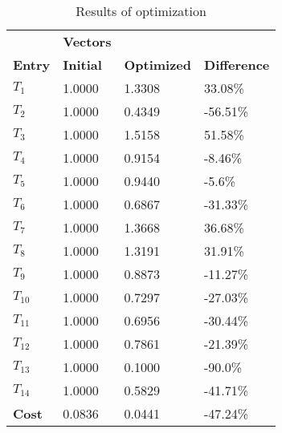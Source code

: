 \begin{table}[H]
\centering
\begin{tabular}{llll}
\textbf{}      & \cellcolor[HTML]{EFEFEF}\textbf{Vectors} & \textbf{} & \textbf{}         \\
\rowcolor[HTML]{EFEFEF} 
\textbf{Entry} & \textbf{Initial} & \textbf{Optimized} & \textbf{Difference} \\
$T_1$ & 1.0000 & 1.3308 & 33.08\% \\ 
$T_2$ & 1.0000 & 0.4349 & -56.51\% \\ 
$T_3$ & 1.0000 & 1.5158 & 51.58\% \\ 
$T_4$ & 1.0000 & 0.9154 & -8.46\% \\ 
$T_5$ & 1.0000 & 0.9440 & -5.6\% \\ 
$T_6$ & 1.0000 & 0.6867 & -31.33\% \\ 
$T_7$ & 1.0000 & 1.3668 & 36.68\% \\ 
$T_8$ & 1.0000 & 1.3191 & 31.91\% \\ 
$T_9$ & 1.0000 & 0.8873 & -11.27\% \\ 
$T_10$ & 1.0000 & 0.7297 & -27.03\% \\ 
$T_11$ & 1.0000 & 0.6956 & -30.44\% \\ 
$T_12$ & 1.0000 & 0.7861 & -21.39\% \\ 
$T_13$ & 1.0000 & 0.1000 & -90.0\% \\ 
$T_14$ & 1.0000 & 0.5829 & -41.71\% \\ 
\rowcolor[HTML]{EFEFEF} 
\textbf{Cost}  & 0.0836 & 0.0441 & -47.24\% \\ 
\end{tabular}
\caption{Results of optimization}
\label{tab:OptimizationAnalysis}
\end{table}